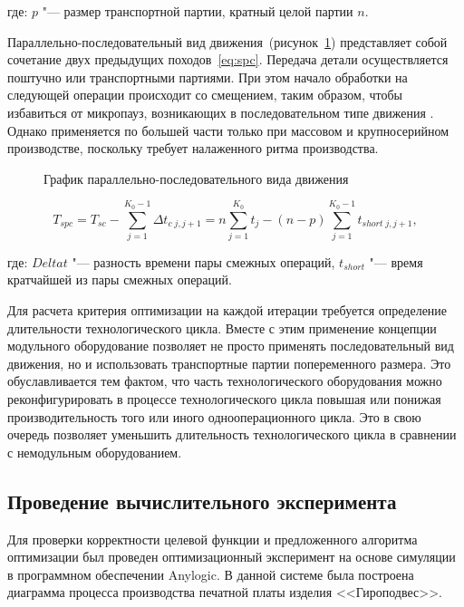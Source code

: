 \noindent где: $p$ "--- размер транспортной партии, кратный целой партии $n$.

Параллельно-последовательный вид движения~(рисунок~\cref{fig:seq-parallel}) представляет собой сочетание двух предыдущих походов~\cref{eq:spc}. Передача детали осуществляется поштучно или транспортными партиями. При этом начало обработки на следующей операции происходит со смещением, таким образом, чтобы избавиться от микропауз, возникающих в последовательном типе движения . Однако применяется по большей части только при массовом и крупносерийном производстве, поскольку требует налаженного ритма производства.

\begin{figure}[!htb]
	\caption{График параллельно-последовательного вида движения}\label{fig:seq-parallel}
\end{figure}

\begin{equation}
T_{spc} = T_{sc} - \sum_{j=1}^{K_{0}-1}\Delta t_{c \;  j,j+1} = n \sum_{j=1}^{K_0}t_j-(n-p)\sum_{j=1}^{K_{0}-1}t_{short \; j,j+1},
\label{eq:spc}
\end{equation}

\noindent где: $Delta t$ "--- разность времени пары смежных операций, $t_{short}$ "--- время кратчайшей из пары смежных операций. 

Для расчета критерия оптимизации на каждой итерации требуется определение длительности технологического цикла. Вместе с этим применение концепции модульного оборудование позволяет не просто применять последовательный вид движения, но и использовать транспортные партии попеременного размера. Это обуславливается тем фактом, что часть технологического оборудования можно реконфигурировать в процессе технологического цикла повышая или понижая производительность того или иного однооперационного цикла.  Это в свою очередь позволяет уменьшить длительность технологического цикла в сравнении с немодульным оборудованием.

\subsection{Проведение вычислительного эксперимента}

Для проверки корректности целевой функции и предложенного алгоритма оптимизации был проведен оптимизационный эксперимент на основе симуляции в программном обеспечении Anylogic. В данной системе была построена диаграмма процесса производства печатной платы изделия <<Гироподвес>>.

